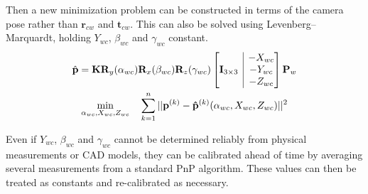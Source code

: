 \documentclass{article}
\makeatletter
\newcommand{\onebytwo}[2]{\ensuremath{\left[\begin{array}{@{}c|c@{}} #1 & #2 \end{array}\right]}}
\makeatother
\begin{document}
Then a new minimization problem can be constructed in terms of the camera pose rather than $\mathbf{r}_{cw}$ and $\mathbf{t}_{cw}$. This can also be solved using Levenberg–Marquardt, holding $Y_{wc}$, $\beta_{wc}$ and $\gamma_{wc}$ constant.
\begin{gather*}
    \hat{\mathbf{p}}=\mathbf{K} \mathbf{R}_y(\alpha_{wc}) \mathbf{R}_x(\beta_{wc}) \mathbf{R}_z(\gamma_{wc}) \onebytwo{\mathbf{I}_{3 \times 3}}{\begin{matrix}-X_{wc} \\ -Y_{wc} \\ -Z_{wc}\end{matrix}}  \mathbf{P}_w \\
    \min_{\alpha_{wc}, X_{wc}, Z_{wc}} \quad \sum_{k=1}^{n}{||\mathbf{p}^{(k)}-\mathbf{\hat{p}}^{(k)}(\alpha_{wc}, X_{wc}, Z_{wc})||^2}
\end{gather*}

Even if $Y_{wc}$, $\beta_{wc}$ and $\gamma_{wc}$ cannot be determined reliably from physical measurements or CAD models, they can be calibrated ahead of time by averaging several measurements from a standard PnP algorithm. These values can then be treated as constants and re-calibrated as necessary.



\end{document}
